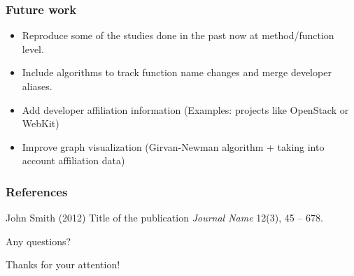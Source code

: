 \documentclass{beamer}
\begin{document}

\begin{frame}
\frametitle{Future work}
\begin{itemize}
\item Reproduce some of the studies done in the past now at method/function level.
\item Include algorithms to track function name changes and merge developer aliases.
\item Add developer affiliation information (Examples: projects like OpenStack or WebKit)
\item Improve graph visualization (Girvan-Newman algorithm + taking into account affiliation data)

\end{itemize}
\end{frame}


\begin{frame}
\frametitle{References}
\footnotesize{
\begin{thebibliography}{99} %
 John Smith (2012)
\newblock Title of the publication
\newblock \emph{Journal Name} 12(3), 45 -- 678.
\end{thebibliography}
}
\end{frame}


\begin{frame}
\Huge{\centerline{Any questions?}}
\end{frame}


\begin{frame}
\Huge{\centerline{Thanks for your attention!}}
\end{frame}

\end{document}
